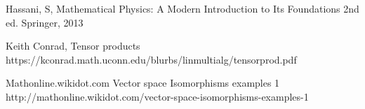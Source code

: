 \documentclass[12pt,a4paper]{article}
\begin{document}
\newpage
\begin{thebibliography}{9}

  Hassani, S, Mathematical Physics: A Modern Introduction to Its Foundations  2nd ed. Springer, 2013
 
  Keith Conrad, Tensor products  https://kconrad.math.uconn.edu/blurbs/linmultialg/tensorprod.pdf

 Mathonline.wikidot.com Vector space Isomorphisms examples 1 http://mathonline.wikidot.com/vector-space-isomorphisms-examples-1


\end{thebibliography}
\end{document}
